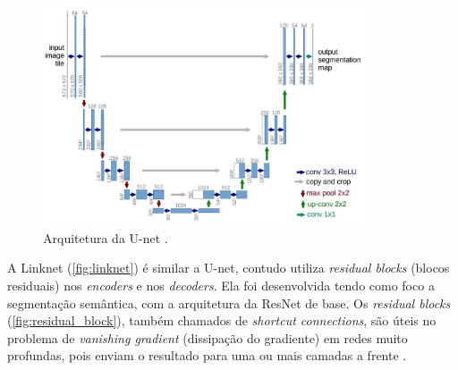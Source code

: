 \documentclass[12pt, a4paper, english, brazil]{article}
\begin{document}
\begin{figure}[htbp]
    \centering
    \includegraphics[width=0.85\textwidth]{img/unet.jpg}
    \caption{Arquitetura da U-net \cite{Ronneberge_2015}.}
    \label{fig:unet}
\end{figure}

A Linknet (\autoref{fig:linknet}) é similar a U-net, contudo utiliza \textit{residual blocks} (blocos residuais) nos \textit{encoders} e nos \textit{decoders}. Ela foi desenvolvida tendo como foco a segmentação semântica, com a arquitetura da ResNet de base. Os \textit{residual blocks} (\autoref{fig:residual_block}), também chamados de \textit{shortcut connections}, são úteis no problema de \textit{vanishing gradient} (dissipação do gradiente) em redes muito profundas, pois enviam o resultado para uma ou mais camadas a frente \cite{Chaurasia_2017, Ebrahimi_2021}.
\end{document}
